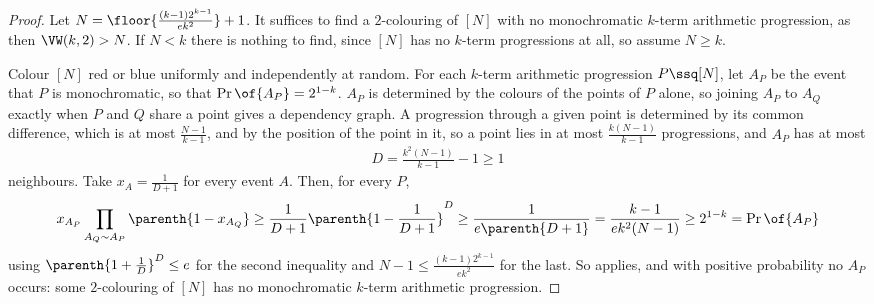 \begin{proof}
    Let $N = \floor{\frac{(k - 1) 2^{k - 1}}{e k^2}} + 1$. It suffices to find a $2$-colouring of $[N]$ with no monochromatic $k$-term arithmetic progression, as then $\VW(k, 2) > N$. If $N < k$ there is nothing to find, since $[N]$ has no $k$-term progressions at all, so assume $N \geq k$.

    Colour $[N]$ red or blue uniformly and independently at random. For each $k$-term arithmetic progression $P \ssq [N]$, let $A_P$ be the event that $P$ is monochromatic, so that $\Pr\of{A_P} = 2^{1 - k}$. $A_P$ is determined by the colours of the points of $P$ alone, so joining $A_P$ to $A_Q$ exactly when $P$ and $Q$ share a point gives a dependency graph. A progression through a given point is determined by its common difference, which is at most $\frac{N - 1}{k - 1}$, and by the position of the point in it, so a point lies in at most $\frac{k (N - 1)}{k - 1}$ progressions, and $A_P$ has at most
    \begin{align*}
        D = \frac{k^2 (N - 1)}{k - 1} - 1 \geq 1
    \end{align*}
    neighbours. Take $x_A = \frac{1}{D + 1}$ for every event $A$. Then, for every $P$,
    \begin{align*}
        x_{A_P} \prod_{A_Q \sim A_P} \parenth{1 - x_{A_Q}}
        \geq \frac{1}{D + 1} \parenth{1 - \frac{1}{D + 1}}^{D}
        \geq \frac{1}{e \parenth{D + 1}}
        = \frac{k - 1}{e k^2 (N - 1)}
        \geq 2^{1 - k}
        = \Pr\of{A_P}
    \end{align*}
    using $\parenth{1 + \frac{1}{D}}^D \leq e$ for the second inequality and $N - 1 \leq \frac{(k - 1) 2^{k - 1}}{e k^2}$ for the last. So  applies, and with positive probability no $A_P$ occurs: some $2$-colouring of $[N]$ has no monochromatic $k$-term arithmetic progression.
\end{proof}
